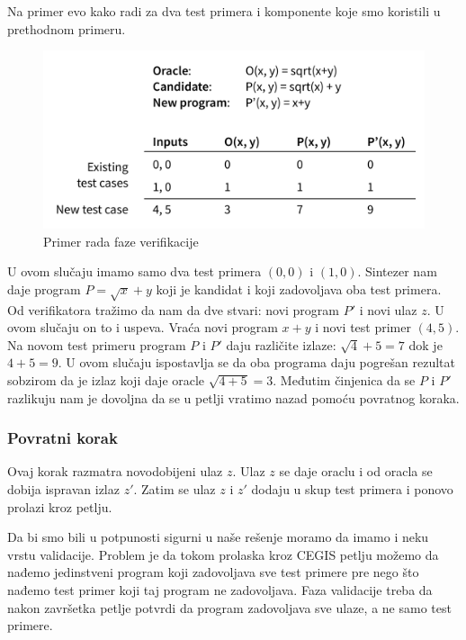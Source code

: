 Na primer evo kako radi za dva test primera i komponente koje smo koristili u prethodnom primeru.

\begin{figure}[t]
    \begin{center}
        \includegraphics[scale=0.6]{resources/oracle-table.png}
    \end{center}
    \caption{Primer rada faze verifikacije}
    \label{fig:oraclePrimer1}
\end{figure}

U ovom slučaju imamo samo dva test primera $(0,0)$ i $(1,0)$. Sintezer nam daje program $P=\sqrt{x}+y$ koji je kandidat i koji zadovoljava oba test primera. Od verifikatora tražimo da nam da dve stvari: novi program $P'$ i novi ulaz $z$. U ovom slučaju on to i uspeva. Vraća novi program $x+y$ i novi test primer $(4,5)$. Na novom test primeru program $P$ i $P'$ daju različite izlaze: $\sqrt{4}+5=7$ dok je $4+5=9$. U ovom slučaju ispostavlja se da oba programa daju pogrešan rezultat sobzirom da je izlaz koji daje oracle $\sqrt{4+5}=3$. Međutim činjenica da se $P$ i $P'$ razlikuju nam je dovoljna da se u petlji vratimo nazad pomoću povratnog koraka.


\subsubsection*{Povratni korak}

Ovaj korak razmatra novodobijeni ulaz $z$. Ulaz $z$ se daje oraclu i od oracla se dobija ispravan izlaz $z'$. Zatim se ulaz $z$ i $z'$ dodaju u skup test primera i ponovo prolazi kroz petlju.

Da bi smo bili u potpunosti sigurni u naše rešenje moramo da imamo i neku vrstu validacije. Problem je da tokom prolaska kroz CEGIS petlju možemo da nađemo jedinstveni program koji zadovoljava sve test primere pre nego što nađemo test primer koji taj program ne zadovoljava. Faza validacije treba da nakon završetka petlje potvrdi da program zadovoljava sve ulaze, a ne samo test primere.


